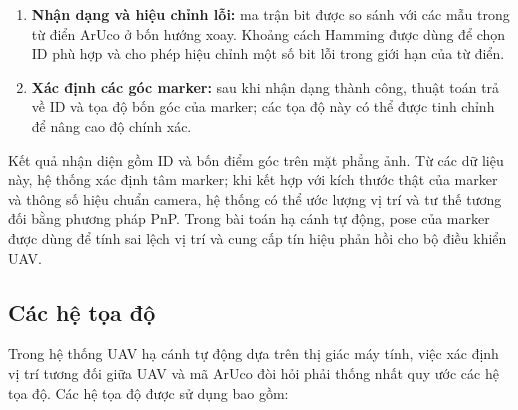 \begin{enumerate}
\begin{enumerate}[a)]
    \item Chia lưới và xác định giá trị bit: vùng ảnh được chia thành một lưới tương ứng với số ô dữ liệu và phần viền của marker. Trong mỗi ô, số điểm ảnh đen và trắng được thống kê; giá trị chiếm đa số quyết định bit $0$ hoặc $1$. Kết quả là một ma trận nhị phân biểu diễn nội dung marker.
    \item Kiểm tra viền đen: các ô thuộc đường viền ngoài của mã ArUco phải có màu đen. Ứng viên sẽ bị loại nếu số bit viền sai vượt quá ngưỡng cho phép; nhờ đó, các vùng tứ giác ngẫu nhiên trong môi trường được loại bỏ trước khi so sánh với từ điển.
  \end{enumerate}
  \item \textbf{Nhận dạng và hiệu chỉnh lỗi:} ma trận bit được so sánh với các mẫu trong từ điển ArUco ở bốn hướng xoay. Khoảng cách Hamming được dùng để chọn ID phù hợp và cho phép hiệu chỉnh một số bit lỗi trong giới hạn của từ điển.
  \item \textbf{Xác định các góc marker:} sau khi nhận dạng thành công, thuật toán trả về ID và tọa độ bốn góc của marker; các tọa độ này có thể được tinh chỉnh để nâng cao độ chính xác.
\end{enumerate}

Kết quả nhận diện gồm ID và bốn điểm góc trên mặt phẳng ảnh. Từ các dữ liệu này, hệ thống xác định tâm marker; khi kết hợp với kích thước thật của marker và thông số hiệu chuẩn camera, hệ thống có thể ước lượng vị trí và tư thế tương đối bằng phương pháp PnP. Trong bài toán hạ cánh tự động, pose của marker được dùng để tính sai lệch vị trí và cung cấp tín hiệu phản hồi cho bộ điều khiển UAV.

\subsection{Các hệ tọa độ}

Trong hệ thống UAV hạ cánh tự động dựa trên thị giác máy tính, việc xác định vị trí tương đối giữa UAV và mã ArUco đòi hỏi phải thống nhất quy ước các hệ tọa độ. Các hệ tọa độ được sử dụng bao gồm:

